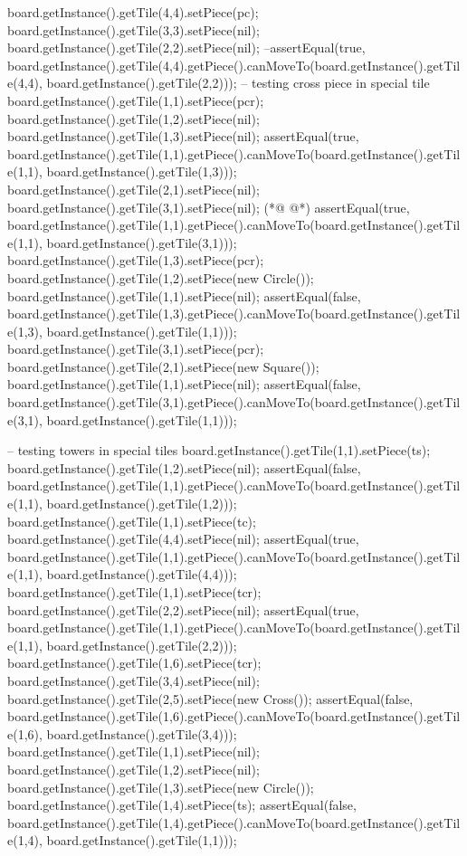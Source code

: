 \begin{vdmpp}[breaklines=true]
   board.getInstance().getTile(4,4).setPiece(pc);
   board.getInstance().getTile(3,3).setPiece(nil);
   board.getInstance().getTile(2,2).setPiece(nil);
   --assertEqual(true, board.getInstance().getTile(4,4).getPiece().canMoveTo(board.getInstance().getTile(4,4), board.getInstance().getTile(2,2)));
   -- testing cross piece in special tile
   board.getInstance().getTile(1,1).setPiece(pcr);
   board.getInstance().getTile(1,2).setPiece(nil);
   board.getInstance().getTile(1,3).setPiece(nil);
   assertEqual(true, board.getInstance().getTile(1,1).getPiece().canMoveTo(board.getInstance().getTile(1,1), board.getInstance().getTile(1,3)));
   board.getInstance().getTile(2,1).setPiece(nil);
   board.getInstance().getTile(3,1).setPiece(nil);
(*@
\label{testMove:180}
@*)
   assertEqual(true, board.getInstance().getTile(1,1).getPiece().canMoveTo(board.getInstance().getTile(1,1), board.getInstance().getTile(3,1)));
   board.getInstance().getTile(1,3).setPiece(pcr);
   board.getInstance().getTile(1,2).setPiece(new Circle());
   board.getInstance().getTile(1,1).setPiece(nil);
   assertEqual(false, board.getInstance().getTile(1,3).getPiece().canMoveTo(board.getInstance().getTile(1,3), board.getInstance().getTile(1,1)));
   board.getInstance().getTile(3,1).setPiece(pcr);
   board.getInstance().getTile(2,1).setPiece(new Square());
   board.getInstance().getTile(1,1).setPiece(nil);
   assertEqual(false, board.getInstance().getTile(3,1).getPiece().canMoveTo(board.getInstance().getTile(3,1), board.getInstance().getTile(1,1)));
   
   -- testing towers in special tiles
   board.getInstance().getTile(1,1).setPiece(ts);
   board.getInstance().getTile(1,2).setPiece(nil);
   assertEqual(false, board.getInstance().getTile(1,1).getPiece().canMoveTo(board.getInstance().getTile(1,1), board.getInstance().getTile(1,2)));
   board.getInstance().getTile(1,1).setPiece(tc);
   board.getInstance().getTile(4,4).setPiece(nil);
   assertEqual(true, board.getInstance().getTile(1,1).getPiece().canMoveTo(board.getInstance().getTile(1,1), board.getInstance().getTile(4,4)));
   board.getInstance().getTile(1,1).setPiece(tcr);
   board.getInstance().getTile(2,2).setPiece(nil);
   assertEqual(true, board.getInstance().getTile(1,1).getPiece().canMoveTo(board.getInstance().getTile(1,1), board.getInstance().getTile(2,2)));
   board.getInstance().getTile(1,6).setPiece(tcr);
   board.getInstance().getTile(3,4).setPiece(nil);
   board.getInstance().getTile(2,5).setPiece(new Cross());
   assertEqual(false, board.getInstance().getTile(1,6).getPiece().canMoveTo(board.getInstance().getTile(1,6), board.getInstance().getTile(3,4)));
   board.getInstance().getTile(1,1).setPiece(nil);
   board.getInstance().getTile(1,2).setPiece(nil);
   board.getInstance().getTile(1,3).setPiece(new Circle());
   board.getInstance().getTile(1,4).setPiece(ts);
   assertEqual(false, board.getInstance().getTile(1,4).getPiece().canMoveTo(board.getInstance().getTile(1,4), board.getInstance().getTile(1,1)));
   

\end{vdmpp}
